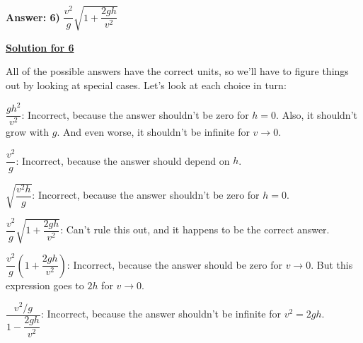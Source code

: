 \textbf{Answer: 6)} $\dfrac{v^2}{g}\sqrt{1+\dfrac{2gh}{v^2}}$

\underline{\textbf{Solution for 6}}

All of the possible answers have the correct units, so we'll have to figure things out by looking at special cases. Let's look at each choice in turn:

$\dfrac{gh^2}{v^2}$: Incorrect, because the answer shouldn't be zero for $h = 0$. Also, it shouldn't grow with $g$. And even worse, it shouldn't be infinite for $v \to 0$.

$\dfrac{v^2}{g}$: Incorrect, because the answer should depend on $h$.

$\sqrt{\dfrac{v^2 h}{g}}$: Incorrect, because the answer shouldn't be zero for $h = 0$.

$\dfrac{v^2}{g}\sqrt{1+\dfrac{2gh}{v^2}}$: Can't rule this out, and it happens to be the correct answer.

$\dfrac{v^2}{g}\left(1+\dfrac{2gh}{v^2}\right)$: Incorrect, because the answer should be zero for $v \to 0$. But this expression goes to $2h$ for $v \to 0$.

$\dfrac{v^2/g}{1-\dfrac{2gh}{v^2}}$: Incorrect, because the answer shouldn't be infinite for $v^2 = 2gh$.